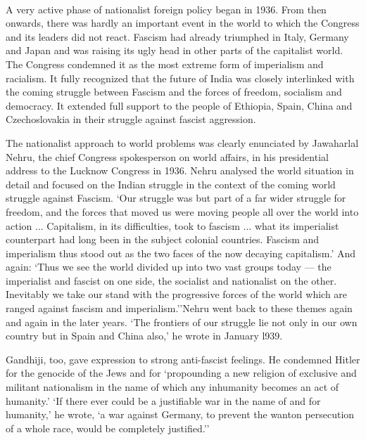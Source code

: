 \paragraph*{}

A very active phase of nationalist foreign policy began in 1936. From then onwards, there was hardly an important event in the world to which the Congress and its leaders did not react. Fascism had already triumphed in Italy, Germany and Japan and was raising its ugly head in other parts of the capitalist world. The Congress condemned it as the most extreme form of imperialism and racialism. It fully recognized that the future of India was closely interlinked with the coming struggle between Fascism and the forces of freedom, socialism and democracy. It extended full support to the people of Ethiopia, Spain, China and Czechoslovakia in their struggle against fascist aggression. 

The nationalist approach to world problems was clearly enunciated by Jawaharlal Nehru, the chief Congress spokesperson on world affairs, in his presidential address to the Lucknow Congress in 1936. Nehru analysed the world situation in detail and focused on the Indian struggle in the context of the coming world struggle against Fascism. `Our struggle was but part of a far wider struggle for freedom, and the forces that moved us were moving people all over the world into action ... Capitalism, in its difficulties, took to fascism ... what its imperialist counterpart had long been in the subject colonial countries. Fascism and imperialism thus stood out as the two faces of the now decaying capitalism.' And again: `Thus we see the world divided up into two vast groups today --- the imperialist and fascist on one side, the socialist and nationalist on the other. Inevitably we take our stand with the progressive forces of the world which are ranged against fascism and imperialism.''Nehru went back to these themes again and again in the later years. `The frontiers of our struggle lie not only in our own country but in Spain and China also,' he wrote in January l939. 

Gandhiji, too, gave expression to strong anti-fascist feelings. He condemned Hitler for the genocide of the Jews and for `propounding a new religion of exclusive and militant nationalism in the name of which any inhumanity becomes an act of humanity.' `If there ever could be a justifiable war in the name of and for humanity,' he wrote, `a war against Germany, to prevent the wanton persecution of a whole race, would be completely justified.'' 

